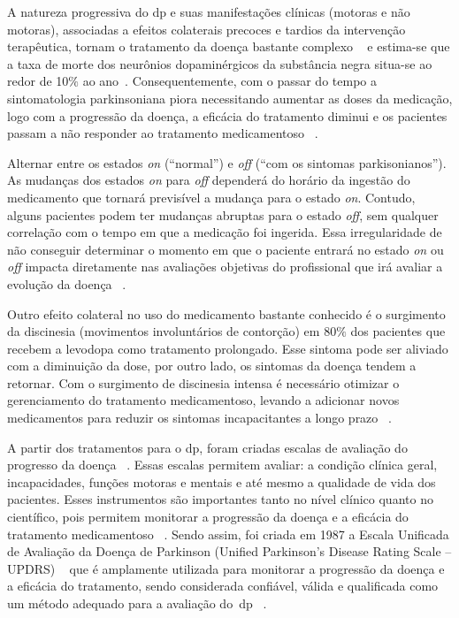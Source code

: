 A natureza progressiva do \ac{dp} e suas manifestações clínicas (motoras e não motoras),  associadas a efeitos colaterais precoces e tardios da intervenção terapêutica, tornam o tratamento da doença bastante complexo ~\cite{protpar010} e estima-se que a taxa de morte dos neurônios dopaminérgicos da substância negra situa-se  ao redor de 10$\%$ ao ano~\cite{national2006parkinson}. Consequentemente, com o passar do tempo a sintomatologia parkinsoniana piora necessitando aumentar as doses da medicação, logo com a progressão da doença, a eficácia do tratamento diminui e os pacientes passam a não responder ao tratamento medicamentoso ~\cite{protpar010}. 

Alternar entre os estados \textit{on} (``normal'') e \textit{off} (``com os sintomas parkisonianos''). As mudanças dos estados \textit{on} para \textit{off} dependerá do horário da ingestão do medicamento que tornará previsível a mudança para o estado \textit{on}. Contudo, alguns pacientes podem ter mudanças abruptas para o estado \textit{off}, sem qualquer correlação com o tempo em que a medicação foi ingerida. Essa irregularidade de não conseguir determinar o momento em que o paciente entrará no estado \textit{on} ou \textit{off} impacta diretamente nas avaliações objetivas do profissional que irá avaliar a evolução da doença ~\cite{kostek12,patel_monitoring_2009}. 

Outro efeito colateral no uso do medicamento bastante conhecido é o surgimento da discinesia (movimentos involuntários de contorção) em 80$\%$ dos pacientes que recebem a levodopa como tratamento prolongado. Esse sintoma pode ser aliviado com a diminuição da dose, por outro lado, os sintomas da doença tendem a retornar. Com o surgimento de discinesia intensa é necessário otimizar o gerenciamento do tratamento medicamentoso, levando a adicionar novos medicamentos para reduzir os sintomas incapacitantes a longo prazo ~\cite{abn2010}. 

A partir dos tratamentos para o \ac{dp}, foram criadas escalas de avaliação do progresso da doença ~\cite{updrs87,goul05}. Essas escalas permitem avaliar: a condição clínica geral, incapacidades, funções motoras e mentais e até mesmo a qualidade de vida dos pacientes. Esses instrumentos são importantes tanto no nível clínico quanto no científico, pois permitem monitorar a progressão da doença e a eficácia do tratamento medicamentoso ~\cite{updrs87,goul05}.  Sendo assim, foi criada em 1987 a Escala Unificada de Avaliação da  Doença de Parkinson (Unified Parkinson’s Disease Rating Scale – UPDRS) ~\cite{updrs87} que é amplamente utilizada para monitorar a progressão da doença e a eficácia do tratamento, sendo considerada confiável, válida e qualificada como um método adequado para a avaliação do~\ac{dp} ~\cite{goul05}. 

